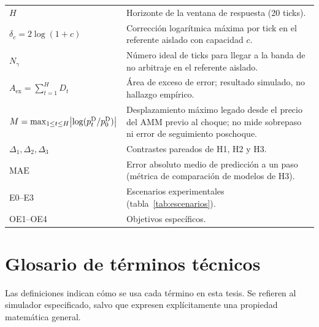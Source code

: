 \begin{center}
\begin{tabularx}{\textwidth}{@{}l X@{}}
$H$ & Horizonte de la ventana de respuesta (20 ticks). \\
$\delta_c=2\log(1+c)$ & Corrección logarítmica máxima por tick en el referente aislado con capacidad $c$. \\
$N_\gamma$ & Número ideal de ticks para llegar a la banda de no arbitraje en el referente aislado. \\
$A_{\mathrm{ex}} = \sum_{t=1}^{H} D_t$ & Área de exceso de error; resultado simulado, no hallazgo empírico. \\
$M = \max_{1\le t\le H}\bigl|\log(p^{\mathrm{D}}_t/p^{\mathrm{D}}_0)\bigr|$ & Desplazamiento máximo legado desde el precio del AMM previo al choque; no mide sobrepaso ni error de seguimiento poschoque. \\
$\Delta_1,\Delta_2,\Delta_3$ & Contrastes pareados de H1, H2 y H3. \\
$\mathrm{MAE}$ & Error absoluto medio de predicción a un paso (métrica de comparación de modelos de H3). \\
E0--E3 & Escenarios experimentales (tabla~\ref{tab:escenarios}). \\
OE1--OE4 & Objetivos específicos. \\
\bottomrule
\end{tabularx}
\end{center}

\section*{Glosario de términos técnicos}
{}

\begingroup
\small
\setlength{\parskip}{0.15em}
Las definiciones indican cómo se usa cada término en esta tesis. Se refieren al
simulador especificado, salvo que expresen explícitamente una propiedad matemática general.

